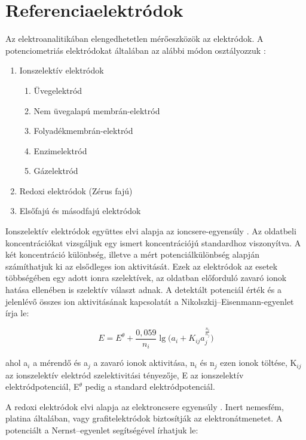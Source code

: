 \section{Referenciaelektródok}

Az elektroanalitikában elengedhetetlen mérőeszközök az elektródok. A potenciometriás elektródokat általában az alábbi módon osztályozzuk \cite{kalman2002az}:

\begin{enumerate}  
    \item Ionszelektív elektródok
      \begin{enumerate}
	\item Üvegelektród
	\item Nem üvegalapú membrán-elektród
	\item Folyadékmembrán-elektród
	\item Enzimelektród
	\item Gázelektród
	\end{enumerate}
    \item Redoxi elektródok (Zérus fajú)
    \item Elsőfajú és másodfajú elektródok
\end{enumerate}

Ionszelektív elektródok együttes elvi alapja az ioncsere-egyensúly \cite{kalman2002az}. Az oldatbeli koncentrációkat vizsgáljuk egy ismert koncentrációjú standardhoz viszonyítva. A két koncentráció különbség, illetve a mért potenciálkülönbség alapján számíthatjuk ki az elsődleges ion aktivitását. Ezek az elektródok az esetek többségében egy adott ionra szelektívek, az oldatban előforduló zavaró ionok hatása ellenében is szelektív választ adnak. A detektált potenciál érték és a jelenlévő összes ion aktivitásának kapcsolatát a Nikolszkij--Eisenmann-egyenlet írja le:

\begin{equation}
E = E^\theta + \frac{0,059}{n_i}\lg \Big (a_i + K_{ij} a_j^\frac{n_i}{n_j} \Big )
\label{eq:nikolszkij}
\end{equation}

ahol a$_i$  a mérendő és a$_j$ a zavaró ionok aktivitása, n$_i$ és n$_j$ ezen ionok töltése, K$_{ij}$ az ionszelektív elektród szelektivitási tényezője, E az ionszelektív elektródpotenciál, E$^\theta$ pedig a standard elektródpotenciál.

A redoxi elektródok elvi alapja az elektroncsere egyensúly \cite{kalman2002az}. Inert nemesfém, platina általában, vagy grafitelektródok biztosítják az elektronátmenetet. A potenciált a Nernst--egyenlet segítségével írhatjuk le:

